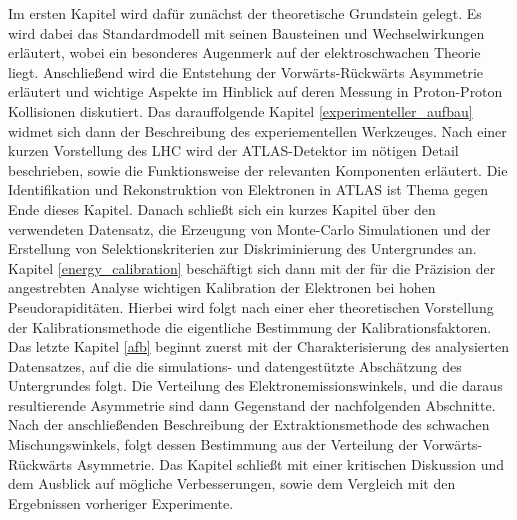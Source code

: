 Im ersten Kapitel wird dafür zunächst der theoretische Grundstein gelegt. Es
wird dabei das Standardmodell mit seinen Bausteinen und Wechselwirkungen
erläutert, wobei ein besonderes Augenmerk auf der elektroschwachen Theorie
liegt. Anschließend wird die Entstehung der Vorwärts-Rückwärts Asymmetrie
erläutert und wichtige Aspekte im Hinblick auf deren Messung in Proton-Proton
Kollisionen diskutiert. Das darauffolgende Kapitel \ref{experimenteller_aufbau}
widmet sich dann der Beschreibung des experiementellen Werkzeuges. Nach einer
kurzen Vorstellung des \acf{LHC} wird der ATLAS-Detektor im nötigen Detail
beschrieben, sowie die Funktionsweise der relevanten Komponenten erläutert.
Die Identifikation und Rekonstruktion von Elektronen in ATLAS ist Thema gegen
Ende dieses Kapitel. Danach schließt sich ein kurzes Kapitel über den
verwendeten Datensatz, die Erzeugung von Monte-Carlo Simulationen und der
Erstellung von Selektionskriterien zur Diskriminierung des Untergrundes an.
Kapitel \ref{energy_calibration} beschäftigt sich dann mit der für die
Präzision der angestrebten Analyse wichtigen Kalibration der Elektronen bei
hohen Pseudorapiditäten. Hierbei wird folgt nach einer eher theoretischen
Vorstellung der Kalibrationsmethode die eigentliche Bestimmung der
Kalibrationsfaktoren. Das letzte Kapitel \ref{afb} beginnt zuerst mit der
Charakterisierung des analysierten Datensatzes, auf die die simulations- und
datengestützte Abschätzung des Untergrundes folgt. Die Verteilung des
Elektron\-emissionswinkels, und die daraus resultierende Asymmetrie sind dann
Gegenstand der nachfolgenden Abschnitte. Nach der anschließenden Beschreibung
der Extraktionsmethode des schwachen Mischungswinkels, folgt dessen Bestimmung
aus der Verteilung der Vorwärts-Rückwärts Asymmetrie. Das Kapitel schließt mit
einer kritischen Diskussion und dem Ausblick auf mögliche Verbesserungen, sowie
dem Vergleich mit den Ergebnissen vorheriger Experimente.

